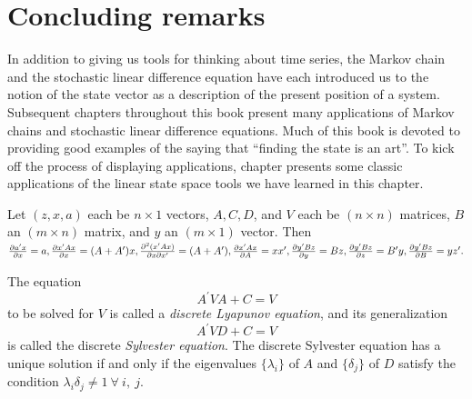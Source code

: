 \section{Concluding remarks}\label{concl1}%
In addition to giving us tools for thinking about time series, the
Markov chain and the stochastic linear difference equation have
each introduced us to the notion of the state vector as a
description of the present position of a system. 
 Subsequent chapters throughout this book present many applications of
Markov chains and stochastic linear difference equations. 
Much of this book 
is devoted to providing good examples of the saying that ``finding the state is an art''.
To kick off the process of displaying applications, chapter
 presents some classic applications of the linear state
space tools we have learned in this chapter. 


\medskip

\label{appendixLQA}%
Let $(z,x,a)$ each be $n\times 1$ vectors, $A,C,D$, and $V$
each be $(n\times n)$ matrices, $B$ an $(m\times n)$ matrix, and $y$
an $(m\times 1)$ vector.  Then
$ {\partial a^\prime x\over \partial x} = a,
{\partial x^\prime A x\over \partial x} = (A + A^\prime) x,
{\partial^2 (x^\prime Ax)\over \partial x \partial x^\prime}=
(A+A^\prime),
{\partial x^\prime Ax\over \partial A} = x x^\prime,
{\partial y^\prime Bz\over \partial y} = Bz,
{\partial y^\prime Bz\over \partial z} = B^\prime y,
{\partial y^\prime Bz\over \partial B} = y z^\prime.$

The equation
$$A^\prime V A + C = V$$
to be solved for $V$ is called a {\it discrete Lyapunov equation}, and
its generalization
$$A^\prime V D + C = V$$
is called the discrete {\it Sylvester equation}.
The discrete Sylvester equation
%
 has a unique solution
if and only if the eigenvalues $\{\lambda_i\}$
of $A$ and $\{\delta_j\}$ of $D$ satisfy the condition
$\lambda_i \delta_j \not=  1 \ \forall \ i, \ j.$



\medskip
{}\label{appa1}%
